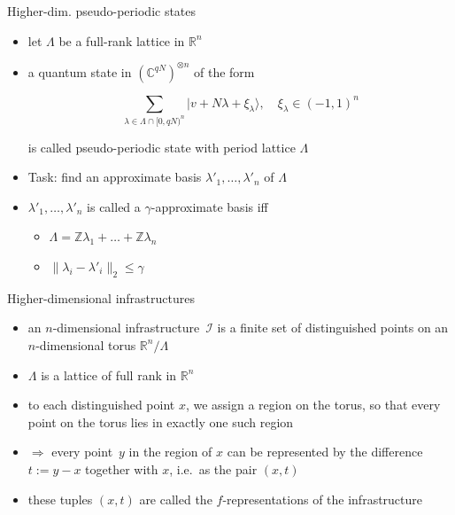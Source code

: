 \documentclass[slideColor]{prosper}
\renewcommand{\R}{\mathbb{R}}
\renewcommand{\>}{\rangle}
\newcommand{\<}{\langle}
\begin{document}

\begin{slide}{Higher-dim. pseudo-periodic states}
\vspace{-0.25cm}
\begin{itemize}
\item let $\Lambda$ be a full-rank lattice in $\R^n$

\medskip
\item a quantum state in ${(\mathbb{C}^{qN})}^{\otimes n}$ of the form

\[
\sum_{\lambda\in\Lambda\cap [0,qN)^n} | v + N \lambda + \xi_\lambda\>, \quad \xi_\lambda\in (-1,1)^n
\]

is called pseudo-periodic state with period lattice $\Lambda$

\medskip
\item
Task: find an approximate basis $\lambda'_1,\ldots,\lambda'_n$ of $\Lambda$

\medskip
\item 
$\lambda'_1,\ldots,\lambda'_n$ is called a $\gamma$-approximate basis iff

\begin{itemize}
\medskip
\item $\Lambda=\mathbb{Z}\lambda_1 + \ldots + \mathbb{Z} \lambda_n$ 

\medskip
\item $\|\lambda_i - \lambda'_i \|_2 \le \gamma$
\end{itemize}
\end{itemize}

\end{slide}


\begin{slide}{Higher-dimensional infrastructures}

\begin{itemize}
	\item an $n$-dimensional infrastructure~$\mathcal{I}$ is a finite set of distinguished
  points on an $n$-dimensional torus $\mathbb{R}^n / \Lambda$
  
  \medskip
  \item $\Lambda$ is a lattice of full rank in $\R^n$ 
  
  \medskip
  \item to each distinguished point $x$, we assign a region on the torus, so
  that every point on the torus lies in exactly one such region
  
  \medskip
  \item $\Rightarrow$ every point~$y$ in the region of $x$ can be represented by the difference $t := y - x$ together
  with $x$, i.e.\ as the pair $(x, t)$ 
  
  \medskip
  \item these tuples $(x, t)$ are called the $f$-representations
  of the infrastructure
\end{itemize}

\end{slide}
\end{document}
